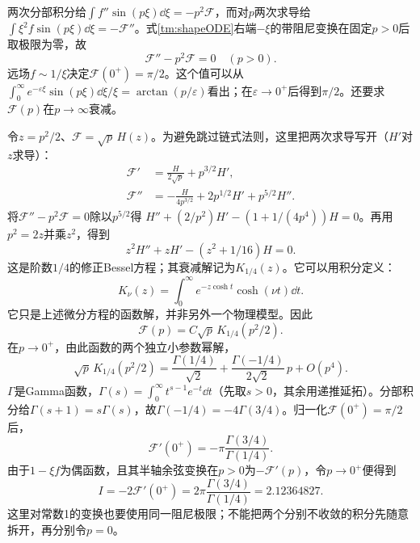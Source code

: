 两次分部积分给$\int f''\sin(p\xi)\dd\xi=-p^2\mathcal F$，而对$p$两次求导给$\int\xi^2f\sin(p\xi)\dd\xi=-\mathcal F''$。式\eqref{tm:shapeODE}右端$-\xi$的带阻尼变换在固定$p>0$后取极限为零，故
\begin{equation}
 \mathcal F''-p^2\mathcal F=0\quad(p>0).
\end{equation}
远场$f\sim1/\xi$决定$\mathcal F(0^+)=\pi/2$。这个值可以从
$\int_0^\infty e^{-\varepsilon\xi}\sin(p\xi)\dd\xi/\xi
=\arctan(p/\varepsilon)$看出；在$\varepsilon\to0^+$后得到$\pi/2$。还要求$\mathcal F(p)$在$p\to\infty$衰减。

令$z=p^2/2$、$\mathcal F=\sqrt p\,H(z)$。为避免跳过链式法则，这里把两次求导写开（$H'$对$z$求导）：
\begin{align*}
 \mathcal F'&=\frac{H}{2\sqrt p}+p^{3/2}H',\\
 \mathcal F''&=-\frac{H}{4p^{3/2}}+2p^{1/2}H'+p^{5/2}H''.
\end{align*}
将$\mathcal F''-p^2\mathcal F=0$除以$p^{5/2}$得
$H''+(2/p^2)H'-(1+1/(4p^4))H=0$。再用$p^2=2z$并乘$z^2$，得到
\begin{equation}
 z^2H''+zH'-(z^2+1/16)H=0.
\end{equation}
这是阶数$1/4$的修正Bessel方程；其衰减解记为$K_{1/4}(z)$。它可以用积分定义：
\begin{equation*}
 K_\nu(z)=\int_0^\infty e^{-z\cosh t}\cosh(\nu t)\dd t.
\end{equation*}
它只是上述微分方程的函数解，并非另外一个物理模型。因此
\begin{equation}
 \mathcal F(p)=C\sqrt p\,K_{1/4}(p^2/2).
\end{equation}
在$p\to0^+$，由此函数的两个独立小参数幂解，
\begin{equation}
 \sqrt p\,K_{1/4}(p^2/2)
 =\frac{\Gamma(1/4)}{\sqrt2}
 +\frac{\Gamma(-1/4)}{2\sqrt2}\,p+O(p^4).
\end{equation}
$\Gamma$是Gamma函数，$\Gamma(s)=\int_0^\infty t^{s-1}e^{-t}\dd t$（先取$s>0$，其余用递推延拓）。分部积分给$\Gamma(s+1)=s\Gamma(s)$，故$\Gamma(-1/4)=-4\Gamma(3/4)$。归一化$\mathcal F(0^+)=\pi/2$后，
\begin{equation}
 \mathcal F'(0^+)=-\pi\frac{\Gamma(3/4)}{\Gamma(1/4)}.
\end{equation}
由于$1-\xi f$为偶函数，且其半轴余弦变换在$p>0$为$-\mathcal F'(p)$，令$p\to0^+$便得到
\begin{equation}
 \boxed{I=-2\mathcal F'(0^+)
 =2\pi\frac{\Gamma(3/4)}{\Gamma(1/4)}=2.12364827.}
\end{equation}
这里对常数1的变换也要使用同一阻尼极限；不能把两个分别不收敛的积分先随意拆开，再分别令$p=0$。


